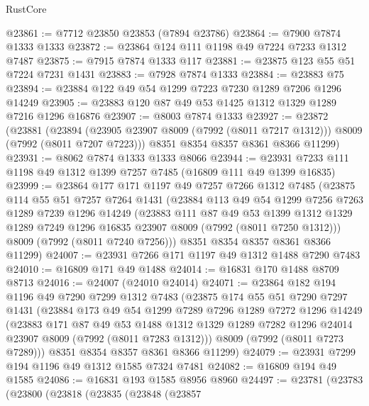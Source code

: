 \begin{lexlean}{RustCore}
\begin{coremodule}
@23861 := @7712 @23850 @23853 (@7894 @23786)
@23864 := @7900 @7874 @1333 @1333
@23872 := @23864 @124 @111 @1198 @49 @7224 @7233 @1312 @7487
@23875 := @7915 @7874 @1333 @117
@23881 := @23875 @123 @55 @51 @7224 @7231 @1431
@23883 := @7928 @7874 @1333
@23884 := @23883 @75
@23894 := @23884 @122 @49 @54 @1299 @7223 @7230 @1289 @7206 @1296 @14249
@23905 := @23883 @120 @87 @49 @53 @1425 @1312 @1329 @1289 @7216 @1296 @16876
@23907 := @8003 @7874 @1333
@23927 := @23872
    (@23881
      (@23894 (@23905 @23907 @8009 (@7992 (@8011 @7217 @1312))) @8009 (@7992 (@8011 @7207 @7223)))
      @8351
      @8354
      @8357
      @8361
      @8366
      @11299)
@23931 := @8062 @7874 @1333 @1333 @8066
@23944 := @23931 @7233 @111 @1198 @49 @1312 @1399 @7257 @7485 (@16809 @111 @49 @1399 @16835)
@23999 := @23864
    @177
    @171
    @1197
    @49
    @7257
    @7266
    @1312
    @7485
    (@23875
      @114
      @55
      @51
      @7257
      @7264
      @1431
      (@23884
        @113
        @49
        @54
        @1299
        @7256
        @7263
        @1289
        @7239
        @1296
        @14249
        (@23883
          @111
          @87
          @49
          @53
          @1399
          @1312
          @1329
          @1289
          @7249
          @1296
          @16835
          @23907
          @8009
          (@7992 (@8011 @7250 @1312)))
        @8009
        (@7992 (@8011 @7240 @7256)))
      @8351
      @8354
      @8357
      @8361
      @8366
      @11299)
@24007 := @23931 @7266 @171 @1197 @49 @1312 @1488 @7290 @7483
@24010 := @16809 @171 @49 @1488
@24014 := @16831 @170 @1488 @8709 @8713
@24016 := @24007 (@24010 @24014)
@24071 := @23864
    @182
    @194
    @1196
    @49
    @7290
    @7299
    @1312
    @7483
    (@23875
      @174
      @55
      @51
      @7290
      @7297
      @1431
      (@23884
        @173
        @49
        @54
        @1299
        @7289
        @7296
        @1289
        @7272
        @1296
        @14249
        (@23883
          @171
          @87
          @49
          @53
          @1488
          @1312
          @1329
          @1289
          @7282
          @1296
          @24014
          @23907
          @8009
          (@7992 (@8011 @7283 @1312)))
        @8009
        (@7992 (@8011 @7273 @7289)))
      @8351
      @8354
      @8357
      @8361
      @8366
      @11299)
@24079 := @23931 @7299 @194 @1196 @49 @1312 @1585 @7324 @7481
@24082 := @16809 @194 @49 @1585
@24086 := @16831 @193 @1585 @8956 @8960
@24497 := @23781
    (@23783
      (@23800
        (@23818
          (@23835
            (@23848
              (@23857

\end{coremodule}
\end{lexlean}
